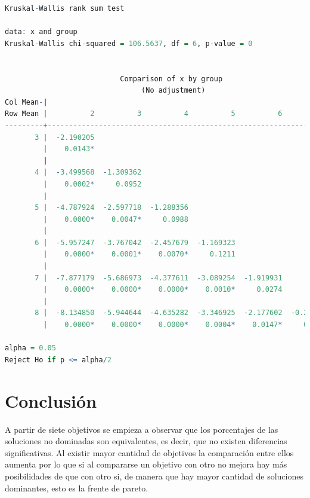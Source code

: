 \documentclass{article}
\begin{document}
\begin{lstlisting}[language=R]
  Kruskal-Wallis rank sum test

data: x and group
Kruskal-Wallis chi-squared = 106.5637, df = 6, p-value = 0


                           Comparison of x by group                            
                                (No adjustment)                                
Col Mean-|
Row Mean |          2          3          4          5          6          7
---------+------------------------------------------------------------------
       3 |  -2.190205
         |    0.0143*
         |
       4 |  -3.499568  -1.309362
         |    0.0002*     0.0952
         |
       5 |  -4.787924  -2.597718  -1.288356
         |    0.0000*    0.0047*     0.0988
         |
       6 |  -5.957247  -3.767042  -2.457679  -1.169323
         |    0.0000*    0.0001*    0.0070*     0.1211
         |
       7 |  -7.877179  -5.686973  -4.377611  -3.089254  -1.919931
         |    0.0000*    0.0000*    0.0000*    0.0010*     0.0274
         |
       8 |  -8.134850  -5.944644  -4.635282  -3.346925  -2.177602  -0.257671
         |    0.0000*    0.0000*    0.0000*    0.0004*    0.0147*     0.3983

alpha = 0.05
Reject Ho if p <= alpha/2
\end{lstlisting}





\section{Conclusión}

A partir de siete objetivos se empieza a observar que los porcentajes de las soluciones no dominadas son equivalentes, es decir, que no existen diferencias significativas. Al existir mayor cantidad de objetivos la comparación entre ellos aumenta por lo que si al compararse un objetivo con otro no mejora hay más posibilidades de que con otro si, de manera que hay mayor cantidad de soluciones dominantes, esto es la frente de pareto.






\end{document}
